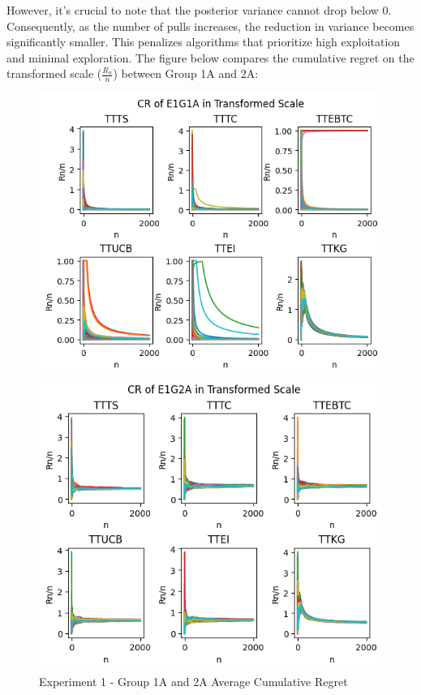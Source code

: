 \documentclass[a4paper, 12pt]{article}
\theoremstyle{definition}
\begin{document}
However, it's crucial to note that the posterior variance cannot drop below 0. Consequently, as the number of pulls increases, the reduction in variance becomes significantly smaller. This penalizes algorithms that prioritize high exploitation and minimal exploration. The figure below compares the cumulative regret on the transformed scale ($\frac{R_n}{n}$) between Group 1A and 2A:

\begin{figure}[H]
\centering
\begin{minipage}{.5\textwidth}
  \centering
  \includegraphics[width=\textwidth]{figures/exp1_cr1.png}
\end{minipage}%
\begin{minipage}{.5\textwidth}
  \centering
  \includegraphics[width=\textwidth]{figures/exp1_cr2.png}
\end{minipage}
\caption{Experiment 1 - Group 1A and 2A Average Cumulative Regret}
\label{figure:exp1_cr}
\end{figure}
\end{document}
